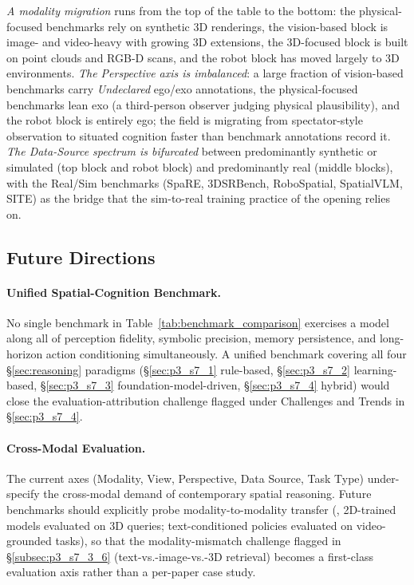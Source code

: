 \emph{A modality migration} runs from the top of the table to the bottom: the physical-focused benchmarks rely on synthetic 3D renderings, the vision-based block is image- and video-heavy with growing 3D extensions, the 3D-focused block is built on point clouds and RGB-D scans, and the robot block has moved largely to 3D environments.
\emph{The Perspective axis is imbalanced}: a large fraction of vision-based benchmarks carry \textit{Undeclared} ego/exo annotations, the physical-focused benchmarks lean exo (a third-person observer judging physical plausibility), and the robot block is entirely ego; the field is migrating from spectator-style observation to situated cognition faster than benchmark annotations record it.
\emph{The Data-Source spectrum is bifurcated} between predominantly synthetic or simulated (top block and robot block) and predominantly real (middle blocks), with the Real/Sim benchmarks (SpaRE, 3DSRBench, RoboSpatial, SpatialVLM, SITE) as the bridge that the sim-to-real training practice of the opening relies on.

\subsection{Future Directions}
\label{subsec:p3-sec7-5-future-directions}

\paragraph{Unified Spatial-Cognition Benchmark.}
No single benchmark in Table~\ref{tab:benchmark_comparison} exercises a model along all of perception fidelity, symbolic precision, memory persistence, and long-horizon action conditioning simultaneously. 
A unified benchmark covering all four §\ref{sec:reasoning} paradigms (§\ref{sec:p3_s7_1} rule-based, §\ref{sec:p3_s7_2} learning-based, §\ref{sec:p3_s7_3} foundation-model-driven, §\ref{sec:p3_s7_4} hybrid) would close the evaluation-attribution challenge flagged under Challenges and Trends in §\ref{sec:p3_s7_4}.

\paragraph{Cross-Modal Evaluation.}
The current axes (Modality, View, Perspective, Data Source, Task Type) under-specify the cross-modal demand of contemporary spatial reasoning. 
Future benchmarks should explicitly probe modality-to-modality transfer (\eg, 2D-trained models evaluated on 3D queries; text-conditioned policies evaluated on video-grounded tasks), so that the modality-mismatch challenge flagged in §\ref{subsec:p3_s7_3_6} (text-vs.-image-vs.-3D retrieval) becomes a first-class evaluation axis rather than a per-paper case study.

